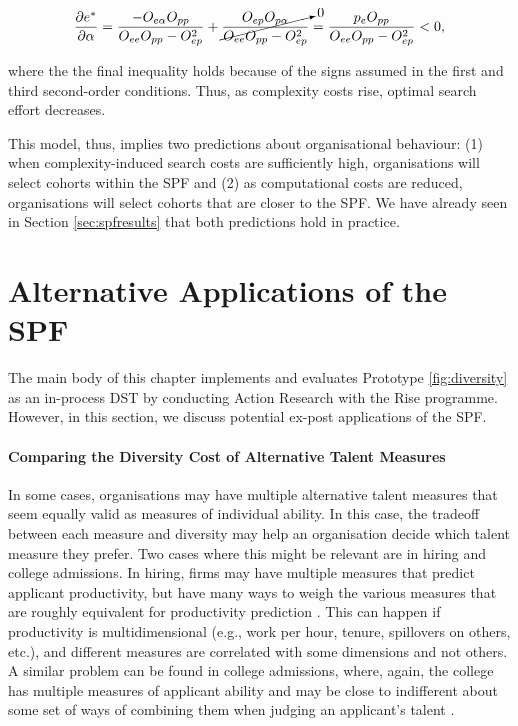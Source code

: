 \begin{equation}
\frac{\partial e^*}{\partial \alpha} = \frac{-O_{e\alpha}O_{pp}}{O_{ee}O_{pp} - O_{ep}^2} + \cancelto{0}{\frac{O_{ep}O_{p\alpha}}{O_{ee}O_{pp} - O_{ep}^2}} = \frac{p_eO_{pp}}{O_{ee}O_{pp} - O_{ep}^2} < 0, \label{eq:comp_stat}
\end{equation}

\noindent where the the final inequality holds because of the signs assumed in the first and third second-order conditions. Thus, as complexity costs rise, optimal search effort decreases.

This model, thus, implies two predictions about organisational behaviour: (1) when complexity-induced search costs are sufficiently high, organisations will select cohorts within the SPF and (2) as computational costs are reduced, organisations will select cohorts that are closer to the SPF. We have already seen in Section \ref{sec:spfresults} that both predictions hold in practice.

\section{Alternative Applications of the SPF}\label{sec:spfapplications}
The main body of this chapter implements and evaluates Prototype \ref{fig:diversity} as an in-process DST by conducting Action Research with the Rise programme. However, in this section, we discuss potential ex-post applications of the SPF.

\paragraph{Comparing the Diversity Cost of Alternative Talent Measures} In some cases, organisations may have multiple alternative talent measures that seem equally valid as measures of individual ability. In this case, the tradeoff between each measure and diversity may help an organisation decide which talent measure they prefer.  Two cases where this might be relevant are in hiring and college admissions. In hiring, firms may have multiple measures that predict applicant productivity, but have many ways to weigh the various measures that are roughly equivalent for productivity prediction \cite{hartigan_fairness_1989}. This can happen if productivity is multidimensional (e.g., work per hour, tenure, spillovers on others, etc.), and different measures are correlated with some dimensions and not others. A similar problem can be found in college admissions, where, again, the college has multiple measures of applicant ability and may be close to indifferent about some set of ways of combining them when judging an applicant's talent \cite{tam2002new}. 


